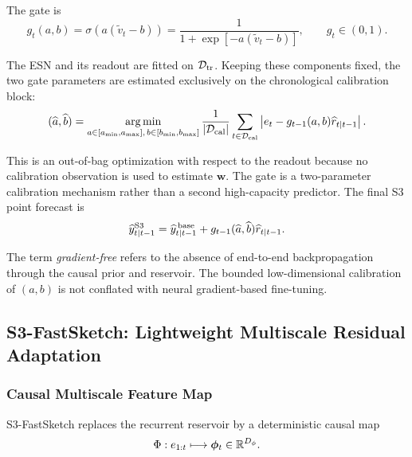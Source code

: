 \documentclass[review,number,sort&compress]{elsarticle}
\begin{document}
The gate is
\begin{equation}
    g_t(a,b)
    =
    \sigma
    \left(
    a(\widetilde{v}_t-b)
    \right)
    =
    \frac{
        1
    }{
        1+\exp[-a(\widetilde{v}_t-b)]
    },
    \qquad
    g_t\in(0,1).
    \label{eq:s3_gate}
\end{equation}

The ESN and its readout are fitted on $\mathcal{D}_{\mathrm{tr}}$. Keeping these components fixed,
the two gate parameters are estimated exclusively on the chronological
calibration block:
\begin{equation}
    (\widehat{a},\widehat{b})
    =
    \operatorname*{arg\,min}_{
        a\in[a_{\min},a_{\max}],
        \,
        b\in[b_{\min},b_{\max}]
    }
    \frac{1}{|\mathcal{D}_{\mathrm{cal}}|}
    \sum_{t\in\mathcal{D}_{\mathrm{cal}}}
    \left|
        e_t
        -
        g_{t-1}(a,b)
        \widehat{r}_{t|t-1}
    \right|.
    \label{eq:oob_gate_optimization}
\end{equation}

This is an out-of-bag optimization with respect to the readout because no
calibration observation is used to estimate $\bm{w}$. The gate is a
two-parameter calibration mechanism rather than a second high-capacity
predictor.
The final S3 point forecast is
\begin{equation}
    \widehat{y}^{\mathrm{S3}}_{t|t-1}
    =
    \widehat{y}^{\,\mathrm{base}}_{t|t-1}
    +
    g_{t-1}(\widehat{a},\widehat{b})
    \widehat{r}_{t|t-1}.
    \label{eq:s3_final_forecast}
\end{equation}

The term \emph{gradient-free} refers to the absence of end-to-end
backpropagation through the causal prior and reservoir. The bounded
low-dimensional calibration of $(a,b)$ is not conflated with neural
gradient-based fine-tuning.

\subsection{S3-FastSketch: Lightweight Multiscale Residual Adaptation}
\label{subsec:fastsketch}

\subsubsection{Causal Multiscale Feature Map}

S3-FastSketch replaces the recurrent reservoir by a deterministic causal map
\begin{equation}
    \Phi:
    e_{1:t}
    \longmapsto
    \bm{\phi}_t
    \in\mathbb{R}^{D_\phi}.
\end{equation}
\end{document}
